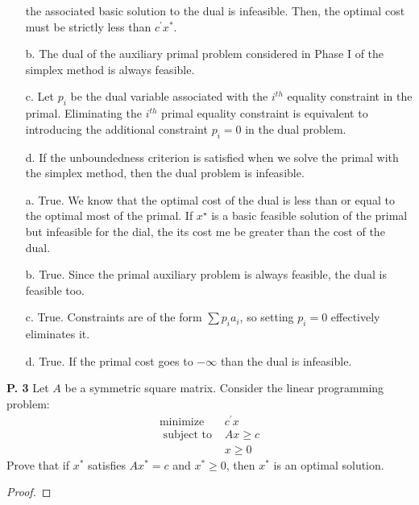 \documentclass{article}
\begin{document}
\begin{jacklist}
\begin{framed}
\begin{itemize}
                the associated basic solution to the dual is infeasible. Then, the optimal cost must be 
                strictly less than $c^{\prime} x^{*}$.
            \item [b.] The dual of the auxiliary primal problem considered in Phase I of the simplex method is always feasible.
            \item [c.] Let $p_{i}$ be the dual variable associated with the $i^{th}$ equality constraint in the primal. 
                Eliminating the $i^{th}$ primal equality constraint is equivalent to introducing the additional constraint 
                $p_{i}=0$ in the dual problem.
            \item [d.]  If the unboundedness criterion is satisfied when we solve the primal with the simplex method, 
                then the dual problem is infeasible. 
        \end{itemize}
    \end{framed}
    \begin{itemize}
        \item [a.] True. We know that the optimal cost of the dual is less than or equal to the optimal most of the primal. If 
            $x^\star$ is a basic feasible solution of the primal but infeasible for the dial, the its cost me be greater than the cost
            of the dual. 
        \item [b.] True. Since the primal auxiliary problem is always feasible, the dual is feasible too.
        \item [c.] True. Constraints are of the form $\sum p_ia_i$, so setting $p_i = 0$ effectively eliminates it. 
        \item [d.] True. If the primal cost goes to $- \infty$ than the dual is infeasible. 
    \end{itemize}
\newpage
    \begin{framed} 
    \item [\textbf{P. 3}] Let $A$ be a symmetric square matrix. Consider the linear programming problem: 
        \begin{align*}
            \text{minimize } & c^\prime x \\
            \text { subject to } & A x \geq c \\
            & x \geq 0
        \end{align*}
        Prove that if $x^{*}$ satisfies $A x^{*}=c$ and $x^{*} \geq 0$, then $x^{*}$ is an optimal solution.
    \end{framed}
    \begin{proof}

\end{proof}
\end{jacklist}
\end{document}
